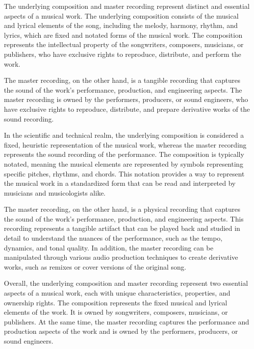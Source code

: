 The underlying composition and master recording represent distinct and essential aspects of a musical work. The underlying composition consists of the musical and lyrical elements of the song, including the melody, harmony, rhythm, and lyrics, which are fixed and notated forms of the musical work. The composition represents the intellectual property of the songwriters, composers, musicians, or publishers, who have exclusive rights to reproduce, distribute, and perform the work.

The master recording, on the other hand, is a tangible recording that captures the sound of the work's performance, production, and engineering aspects. The master recording is owned by the performers, producers, or sound engineers, who have exclusive rights to reproduce, distribute, and prepare derivative works of the sound recording.

In the scientific and technical realm, the underlying composition is considered a fixed, heuristic representation of the musical work, whereas the master recording represents the sound recording of the performance. The composition is typically notated, meaning the musical elements are represented by symbols representing specific pitches, rhythms, and chords. This notation provides a way to represent the musical work in a standardized form that can be read and interpreted by musicians and musicologists alike.

The master recording, on the other hand, is a physical recording that captures the sound of the work's performance, production, and engineering aspects. This recording represents a tangible artifact that can be played back and studied in detail to understand the nuances of the performance, such as the tempo, dynamics, and tonal quality. In addition, the master recording can be manipulated through various audio production techniques to create derivative works, such as remixes or cover versions of the original song.

Overall, the underlying composition and master recording represent two essential aspects of a musical work, each with unique characteristics, properties, and ownership rights. The composition represents the fixed musical and lyrical elements of the work. It is owned by songwriters, composers, musicians, or publishers. At the same time, the master recording captures the performance and production aspects of the work and is owned by the performers, producers, or sound engineers.